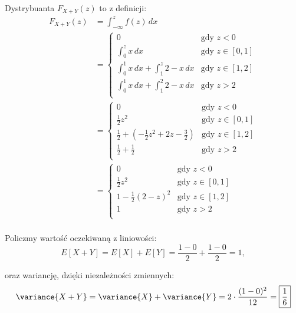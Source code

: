 Dystrybuanta \(F_{X+Y}(z)\) to z definicji:
\begin{align*}
	F_{X+Y}(z)
	 & = \int_{-\infty}^{z} f(z) \,dx                                 \\
	 & = \begin{cases}
		     0
		      & \text{gdy \(z < 0\)}        \\
		     \int_{0}^{z} x \, dx
		      & \text{gdy \(z \in [0, 1]\)} \\
		     \int_{0}^{1} x \, dx + \int_{1}^{z} 2-x \, dx
		      & \text{gdy \(z \in [1, 2]\)} \\
		     \int_{0}^{1} x \, dx + \int_{1}^{2} 2-x \, dx
		      & \text{gdy \(z > 2\)}        \\
	     \end{cases}                 \\
	 & = \begin{cases}
		     0
		      & \text{gdy \(z < 0\)}        \\
		     \frac{1}{2}z^2
		      & \text{gdy \(z \in [0, 1]\)} \\
		     \frac{1}{2} + \left(-\frac{1}{2}z^2 + 2z - \frac{3}{2}\right)
		      & \text{gdy \(z \in [1, 2]\)} \\
		     \frac{1}{2} + \frac{1}{2}
		      & \text{gdy \(z > 2\)}        \\
	     \end{cases} \\
	 & = \boxed{\begin{cases}
			            0
			             & \text{gdy \(z < 0\)}        \\
			            \frac{1}{2}z^2
			             & \text{gdy \(z \in [0, 1]\)} \\
			            1 - \frac{1}{2}(2-z)^2
			             & \text{gdy \(z \in [1, 2]\)} \\
			            1
			             & \text{gdy \(z > 2\)}        \\
		            \end{cases}}            \\
\end{align*}

Policzmy wartość oczekiwaną z liniowości:
\[
	E[X+Y] = E[X] + E[Y] = \frac{1-0}{2} + \frac{1-0}{2} = \boxed{1},
\]

oraz wariancję, dzięki niezależności zmiennych:
\[
	\variance{X+Y}
	= \variance{X} + \variance{Y}
	= 2 \cdot \frac{(1-0)^2}{12}
	= \boxed{\frac{1}{6}}
\]

